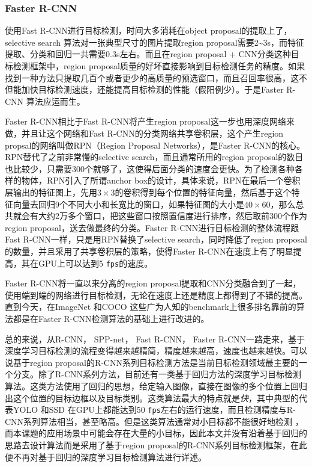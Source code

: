 \subsubsection{Faster R-CNN}
使用Fast R-CNN进行目标检测，时间大多消耗在object proposal的提取上了，selective search \cite{selective-search} 算法对一张典型尺寸的图片提取region proposal需要2\textasciitilde 3s，而特征提取、分类和回归一共需要0.3s左右。而且在region proposal + CNN分类这种目标检测框架中，region proposal质量的好坏直接影响到目标检测任务的精度。如果找到一种方法只提取几百个或者更少的高质量的预选窗口，而且召回率很高，这不但能加快目标检测速度，还能提高目标检测的性能（假阳例少）。于是Faster R-CNN \cite{faster rcnn} 算法应运而生。

Faster R-CNN相比于Fast R-CNN将产生region proposal这一步也用深度网络来做，并且让这个网络和Fast R-CNN的分类网络共享卷积层，这个产生region propsal的网络叫做RPN（Region Proposal Networks），是Faster R-CNN的核心。RPN替代了之前非常慢的selective search，而且通常所用的region proposal的数目也比较少，只需要300个就够了，这使得后面分类的速度会更快。为了检测各种各样的物体，RPN引入了所谓anchor box的设计，具体来说，RPN在最后一个卷积层输出的特征图上，先用$3\times3$的卷积得到每个位置的特征向量，然后基于这个特征向量去回归9个不同大小和长宽比的窗口，如果特征图的大小是$40\times60$，那么总共就会有大约2万多个窗口，把这些窗口按照置信度进行排序，然后取前300个作为region proposal，送去做最终的分类。Faster R-CNN进行目标检测的整体流程跟Fast R-CNN一样，只是用RPN替换了selective search，同时降低了region proposal的数量，并且采用了共享卷积层的策略，使得Faster R-CNN在速度上有了明显提高，其在GPU上可以达到5 \texttt{fps}的速度。

Faster R-CNN将一直以来分离的region proposal提取和CNN分类融合到了一起，使用端到端的网络进行目标检测，无论在速度上还是精度上都得到了不错的提高。直到今天，在ImageNet \cite{imagenet} 和COCO \cite{coco} 这些广为人知的benchmark上很多排名靠前的算法都是在Faster R-CNN检测算法的基础上进行改进的。

总的来说，从R-CNN， SPP-net， Fast R-CNN， Faster R-CNN一路走来，基于深度学习目标检测的流程变得越来越精简，精度越来越高，速度也越来越快。可以说基于region proposal的R-CNN系列目标检测方法是当前目标检测领域最主要的一个分支。除了R-CNN系列方法，目前还有一类基于回归方法的深度学习目标检测算法。这类方法使用了回归的思想，给定输入图像，直接在图像的多个位置上回归出这个位置的目标边框以及目标类别。这类算法最大的特点就是\emph{快}，其中典型的代表YOLO \cite{yolo} 和SSD \cite{ssd} 在GPU上都能达到50 \texttt{fps}左右的运行速度，而且检测精度与R-CNN系列算法相当，甚至略高。但是这类算法通常对小目标都不能很好地检测 \cite{ssd}，而本课题的应用场景中可能会存在大量的小目标，因此本文并没有沿着基于回归的思路去设计算法而是采用了基于region proposal的R-CNN系列目标检测框架，在此便不再对基于回归的深度学习目标检测算法进行详述。

